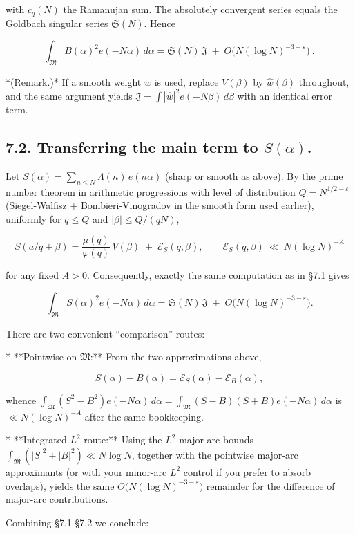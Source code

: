 \documentclass[11pt]{article}
\theoremstyle{definition}
\theoremstyle{remark}
\begin{document}
with $c_q(N)$ the Ramanujan sum. The absolutely convergent series equals the Goldbach singular series $\mathfrak S(N)$. Hence

$$
	\boxed{\,\int_{\mathfrak M} B(\alpha)^2 e(-N\alpha)\,d\alpha
		=\mathfrak S(N)\,\mathfrak J\;+\;O\!\big(N(\log N)^{-3-\varepsilon}\big)\ .\ }
$$

*(Remark.)* If a smooth weight $w$ is used, replace $V(\beta)$ by $\widehat w(\beta)$ throughout, and the same argument yields $\mathfrak J=\int|\widehat w|^2 e(-N\beta)\,d\beta$ with an identical error term.

\subsection*{7.2. Transferring the main term to $S(\alpha)$.}

Let $S(\alpha)=\sum_{n\le N}\Lambda(n)\,e(n\alpha)$ (sharp or smooth as above). By the prime number theorem in arithmetic progressions with level of distribution $Q=N^{1/2-\varepsilon}$ (Siegel-Walfisz + Bombieri-Vinogradov in the smooth form used earlier), uniformly for $q\le Q$ and $|\beta|\le Q/(qN)$,

$$
	S(a/q+\beta)=\frac{\mu(q)}{\varphi(q)}\,V(\beta) \;+\; \mathcal E_S(q,\beta),
	\qquad \mathcal E_S(q,\beta)\ \ll\ N(\log N)^{-A}
$$

for any fixed $A>0$. Consequently, exactly the same computation as in §7.1 gives

$$
	\int_{\mathfrak M} S(\alpha)^2 e(-N\alpha)\,d\alpha
	=\mathfrak S(N)\,\mathfrak J\;+\;O\!\big(N(\log N)^{-3-\varepsilon}\big).
$$

There are two convenient “comparison” routes:

* **Pointwise on $\mathfrak M$:** From the two approximations above,

$$
	S(\alpha)-B(\alpha)=\mathcal E_S(\alpha)-\mathcal E_B(\alpha),
$$

whence $\int_{\mathfrak M}(S^2-B^2)e(-N\alpha)\,d\alpha =\int_{\mathfrak M}(S-B)(S+B)e(-N\alpha)\,d\alpha$
is $\ll N(\log N)^{-A}$ after the same bookkeeping.

* **Integrated $L^2$ route:** Using the $L^2$ major-arc bounds $\int_{\mathfrak M}(|S|^2+|B|^2)\ll N\log N$, together with the pointwise major-arc approximants (or with your minor-arc $L^2$ control if you prefer to absorb overlaps), yields the same $O\big(N(\log N)^{-3-\varepsilon}\big)$ remainder for the difference of major-arc contributions.

Combining §7.1-§7.2 we conclude:
\end{document}
